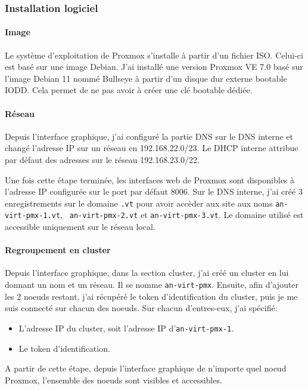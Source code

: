 \documentclass[12pt]{article}
\begin{document}
\subsubsection{Installation logiciel}
\paragraph{Image}
Le système d'exploitation de Proxmox s'installe à partir d'un fichier ISO. Celui-ci est basé sur une image Debian. 
J'ai installé une version Proxmox VE 7.0 basé sur l'image Debian 11 nommé Bullseye à partir d'un disque dur externe bootable IODD. 
Cela permet de ne pas avoir à créer une clé bootable dédiée.

\paragraph{Réseau}
Depuis l'interface graphique, j'ai configuré la partie DNS sur le DNS interne et changé l'adresse IP sur un réseau en 192.168.22.0/23. 
Le DHCP interne attribue par défaut des adresses sur le réseau 192.168.23.0/22.

Une fois cette étape terminée, les interfaces web de Proxmox sont disponibles à l'adresse IP configurée sur le port par défaut 8006.
Sur le DNS interne, j'ai créé 3 enregistrements sur le domaine \verb|.vt| pour avoir accèder aux site aux noms \verb|an-virt-pmx-1.vt|, \verb| an-virt-pmx-2.vt| et \verb|an-virt-pmx-3.vt|.
Le domaine utilisé est accessible uniquement sur le réseau local.

\paragraph{Regroupement en cluster}
Depuis l'interface graphique, dans la section cluster, j'ai créé un cluster en lui donnant un nom et un réseau. Il se nomme \verb|an-virt-pmx|.
Ensuite, afin d'ajouter les 2 noeuds restant, j'ai récupéré le token d'identification du cluster, puis je me suis connecté sur chacun des noeuds. 
Sur chacun d'entres-eux, j'ai spécifié:
\begin{itemize}
    \item L'adresse IP du cluster, soit l'adresse IP d'\verb|an-virt-pmx-1|.
    \item Le token d'identification.
\end{itemize}

A partir de cette étape, depuis l'interface graphique de n'importe quel noeud Proxmox, l'ensemble des noeuds sont visibles et accessibles.
\end{document}
